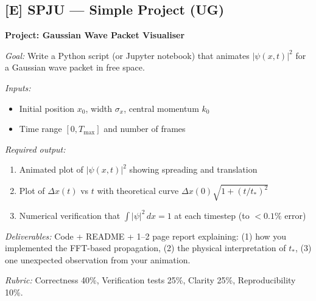 \subsection*{[E] SPJU — Simple Project (UG)}
\begin{tcolorbox}[ugprobbox, title={SPJU · L01 · Tiers 2–3 · 2–4 hrs}]
\textbf{Project: Gaussian Wave Packet Visualiser}

\textit{Goal:} Write a Python script (or Jupyter notebook) that animates $|\psi(x,t)|^2$
for a Gaussian wave packet in free space.

\textit{Inputs:}
\begin{itemize}[topsep=2pt]
  \item Initial position $x_0$, width $\sigma_x$, central momentum $k_0$
  \item Time range $[0, T_{\max}]$ and number of frames
\end{itemize}

\textit{Required output:}
\begin{enumerate}[topsep=2pt]
  \item Animated plot of $|\psi(x,t)|^2$ showing spreading and translation
  \item Plot of $\Delta x(t)$ vs $t$ with theoretical curve $\Delta x(0)\sqrt{1+(t/t_*)^2}$
  \item Numerical verification that $\int|\psi|^2\,dx = 1$ at each timestep (to $<0.1\%$ error)
\end{enumerate}

\textit{Deliverables:} Code + README + 1–2 page report explaining:
(1) how you implemented the FFT-based propagation, (2) the physical interpretation of $t_*$,
(3) one unexpected observation from your animation.

\textit{Rubric:} Correctness 40\%, Verification tests 25\%, Clarity 25\%, Reproducibility 10\%.
\end{tcolorbox}

